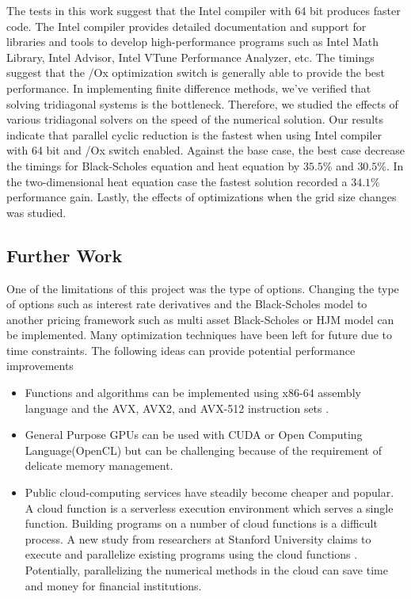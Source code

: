 \documentclass[12pt, oneside]{book}
\theoremstyle{plain}
\theoremstyle{definition}
\begin{document}
The tests in this work suggest that the Intel compiler with 64 bit produces faster code. The Intel compiler provides detailed documentation and support for libraries and tools to develop high-performance programs such as Intel Math Library, Intel Advisor, Intel VTune Performance Analyzer, etc. The timings suggest that the /Ox optimization switch is generally able to provide the best performance. In implementing finite difference methods, we’ve verified that solving tridiagonal systems is the bottleneck. Therefore, we studied the effects of various tridiagonal solvers on the speed of the numerical solution. 
Our results indicate that parallel cyclic reduction is the fastest when using Intel compiler with 64 bit and /Ox switch enabled. 
Against the base case, the best case decrease the timings for Black-Scholes equation and heat equation by $35.5 \%$ and $30.5 \%$. In the two-dimensional heat equation case the fastest solution recorded a  $34.1 \%$ performance gain. Lastly, the effects of optimizations when the grid size changes was studied. 


\subsection{Further Work}
One of the limitations of this project was the type of options. Changing the type of options such as interest rate derivatives and the Black-Scholes model to another pricing framework such as multi asset Black-Scholes or HJM model \cite{kohl} can be implemented. Many optimization techniques have been left for future due to time constraints. The following ideas can provide potential performance improvements
\begin{itemize}
\item Functions and algorithms can be implemented using x86-64 assembly language and the AVX, AVX2, and AVX-512 instruction sets \cite{kusswurm}.
\item General Purpose GPUs can be used with CUDA or Open Computing Language(OpenCL) but can be challenging because of the requirement of delicate memory management.
\item Public cloud-computing services have steadily become cheaper and popular. A cloud function is a serverless execution environment which serves a single function. Building programs on a number of cloud functions is a difficult process. A new study from researchers at Stanford University claims to execute and parallelize existing programs using the cloud functions  \cite{cloudfunc}. Potentially, parallelizing the numerical methods in the cloud can save time and money for financial institutions.
\end{itemize}
\end{document}
